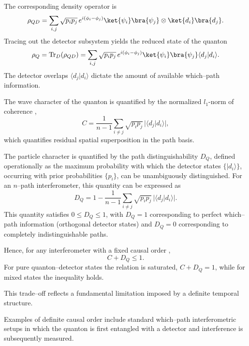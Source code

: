 \documentclass[aps,pra,reprint,superscriptaddress]{revtex4-2}
\begin{document}
	The corresponding density operator is
	\begin{equation}
		\rho_{QD}=\sum_{i,j} \sqrt{p_i p_j}\,e^{i(\phi_i-\phi_j)}
		\ket{\psi_i}\bra{\psi_j}\otimes
		\ket{d_i}\bra{d_j}.
        \label{eq:fixed_dop}
	\end{equation}
    Tracing out the detector subsystem yields the reduced state of the quanton
	\begin{equation}
		\rho_Q
		= \operatorname{Tr}_D(\rho_{QD})
		= \sum_{i,j} \sqrt{p_i p_j}\,e^{i(\phi_i-\phi_j)}
		\ket{\psi_i}\bra{\psi_j}
		\langle d_j|d_i\rangle.
	\end{equation}
	The detector overlaps $\langle d_j|d_i\rangle$ dictate the amount of available
	which--path information.
	
	The wave character of the quanton is quantified by the normalized $l_1$-norm of coherence \cite{Bera2015,PaulQureshi2017},
	\begin{equation}
		C
		= \frac{1}{n-1}
		\sum_{i\neq j}
		\sqrt{p_i p_j}\,
		\big|\langle d_j|d_i\rangle\big|,
        \label{eq:coherence}
	\end{equation}
	which quantifies residual spatial superposition in the path basis.
	
	The particle character is quantified by the path distinguishability $D_Q$,
defined operationally as the maximum probability with which the detector states
$\{|d_i\rangle\}$, occurring with prior probabilities $\{p_i\}$, can be
unambiguously distinguished. For an $n$--path interferometer, this quantity can be expressed as~\cite{SiddiquiQureshi2015}
\begin{equation}
	D_Q
	= 1 - \frac{1}{n-1}
	\sum_{i\neq j}
	\sqrt{p_i p_j}\,
	\big|\langle d_j|d_i\rangle\big|.
\end{equation}
This quantity satisfies $0 \le D_Q \le 1$, with $D_Q=1$ corresponding to
perfect which--path information (orthogonal detector states) and $D_Q=0$
corresponding to completely indistinguishable paths.

    Hence, for any interferometer with a fixed causal order \cite{Bera2015},
\begin{equation}
	C + D_Q \leq 1.
	\label{CDQ}
\end{equation}
For pure quanton--detector states the relation is saturated,
$C + D_Q = 1$, while for mixed states the inequality holds.

This trade--off reflects a fundamental limitation imposed
by a definite temporal structure. 

Examples of definite causal order include standard
which--path interferometric setups in which the quanton
is first entangled with a detector and interference
is subsequently measured.
\end{document}
